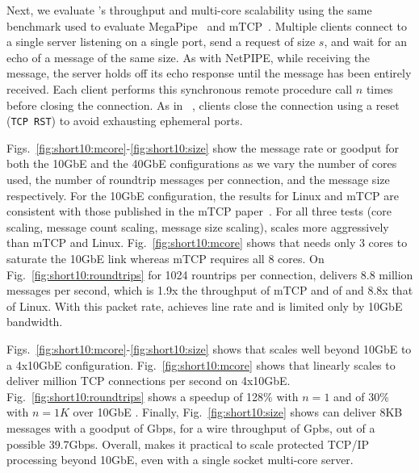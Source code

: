 Next, we evaluate \ix's throughput and multi-core scalability using
the same benchmark used to evaluate
MegaPipe~\cite{DBLP:conf/osdi/HanMCR12} and
mTCP~\cite{jeong2014mtcp}. Multiple clients connect to a single server
listening on a single port, send a request of size $s$, and wait for
an echo of a message of the same size.  As with NetPIPE, while
receiving the message, the server holds off its echo response until
the message has been entirely received.  Each client performs this
synchronous remote procedure call $n$ times before closing the
connection.  As in ~\cite{jeong2014mtcp}, clients close the connection
using a reset (\texttt{TCP RST}) to avoid exhausting ephemeral ports.



Figs.~\ref{fig:short10:mcore}-\ref{fig:short10:size} show the message
rate or goodput for both the 10GbE and the 40GbE configurations as we
vary the number of cores used, the number of roundtrip messages per
connection, and the message size respectively.  For the 10GbE
configuration, the results for Linux and mTCP are consistent with
those published in the mTCP paper~\cite{jeong2014mtcp}.  For all three
tests (core scaling, message count scaling, message size scaling), \ix
scales more aggressively than mTCP and
Linux. Fig.~\ref{fig:short10:mcore} shows that \ix needs only 3 cores
to saturate the 10GbE link whereas mTCP requires all 8 cores. On
Fig.~\ref{fig:short10:roundtrips} for 1024 rountrips per connection,
\ix delivers 8.8 million messages per second, which is
1.9x the throughput of mTCP and of and  8.8x that of
Linux. With this packet rate, \ix achieves line rate and is limited
only by 10GbE bandwidth.


Figs.~\ref{fig:short10:mcore}-\ref{fig:short10:size} shows that \ix
scales well beyond 10GbE to a 4x10GbE configuration.
Fig.~\ref{fig:short10:mcore} shows that \ix linearly scales to deliver
million TCP connections per second on 4x10GbE.
Fig.~\ref{fig:short10:roundtrips} shows a speedup of 128\% with $n=1$
and of 30\% with $n=1K$ over 10GbE \ix.  Finally,
Fig.~\ref{fig:short10:size} shows \ix can deliver 8KB messages with a
goodput of Gbps, for a wire throughput of
Gpbs, out of a possible 39.7Gbps.  Overall, \ix makes
it practical to scale protected TCP/IP processing beyond 10GbE, even
with a single socket multi-core server.

